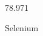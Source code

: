 \documentclass[12pt]{article}
\begin{document}
\hfill{}
\vfill
\begin{center}
  {\fontsize{50}{60}
  }

  \vspace{1em}

  78.971

Selenium
\end{center}
\vfill
\end{document}
